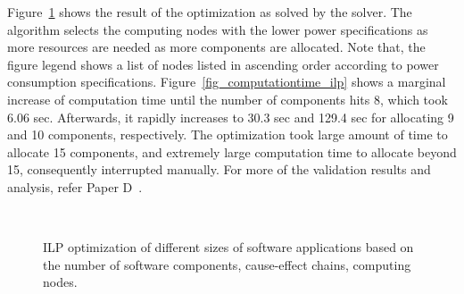 Figure~\ref{fig_ilp_results} shows the result of the \ilp{} optimization as solved by the \cplex{} solver. The algorithm selects the computing nodes with the lower power specifications as more resources are needed as more components are allocated. Note that, the figure legend shows a list of nodes listed in ascending order according to power consumption specifications. Figure~\ref{fig_computationtime_ilp} shows a marginal increase of computation time until the number of components hits 8, which took 6.06 sec. Afterwards, it rapidly increases to 30.3 sec and 129.4 sec for allocating 9 and 10 components, respectively. The optimization took large amount of time to allocate 15 components, and extremely large computation time to allocate beyond 15, consequently interrupted manually. For more of the validation results and analysis, refer Paper D~\cite{Mahmud5222}.
\begin{figure}[h] 
	\centering
	 ~
	\caption{ILP optimization of different sizes of software applications based on the number of software components, cause-effect chains, computing nodes.} \label{fig_ilp_results}
\end{figure}

